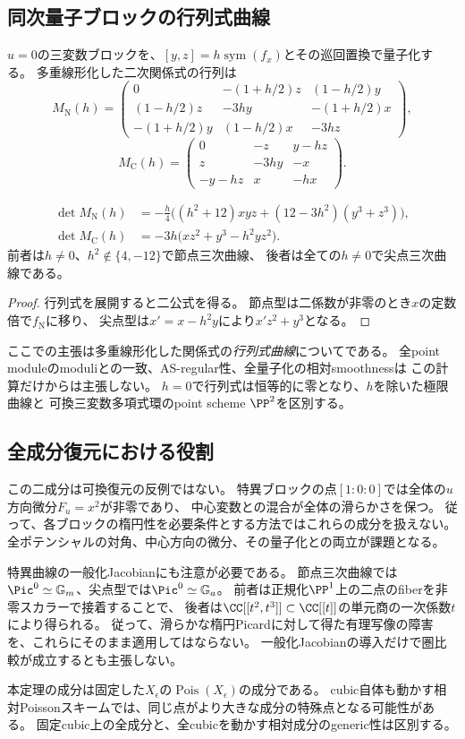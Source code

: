 \subsection{同次量子ブロックの行列式曲線}
$u=0$の三変数ブロックを、$[y,z]=h\operatorname{sym}(f_x)$とその巡回置換で量子化する。
多重線形化した二次関係式の行列は
\[
 M_{\mathrm N}(h)=\begin{pmatrix}
 0&-(1+h/2)z&(1-h/2)y\\
 (1-h/2)z&-3hy&-(1+h/2)x\\
 -(1+h/2)y&(1-h/2)x&-3hz
 \end{pmatrix},
\]
\[
 M_{\mathrm C}(h)=\begin{pmatrix}0&-z&y-hz\\z&-3hy&-x\\-y-hz&x&-hx\end{pmatrix}.
\]
\begin{proposition}\label{ne:quantum}
\begin{align*}
 \det M_{\mathrm N}(h)&=-\frac h4\bigl((h^2+12)xyz+(12-3h^2)(y^3+z^3)\bigr),\\
 \det M_{\mathrm C}(h)&=-3h\bigl(xz^2+y^3-h^2yz^2\bigr).
\end{align*}
前者は$h\ne0$、$h^2\notin\{4,-12\}$で節点三次曲線、
後者は全ての$h\ne0$で尖点三次曲線である。
\end{proposition}
\begin{proof}
行列式を展開すると二公式を得る。
節点型は二係数が非零のとき$x$の定数倍で$f_{\mathrm N}$に移り、
尖点型は$x'=x-h^2y$により$x'z^2+y^3$となる。
\end{proof}
ここでの主張は多重線形化した関係式の\emph{行列式曲線}についてである。
全point moduleのmoduliとの一致、AS-regular性、全量子化の相対smoothnessは
この計算だけからは主張しない。
$h=0$で行列式は恒等的に零となり、$h$を除いた極限曲線と
可換三変数多項式環のpoint scheme $\PP^2$を区別する。

\subsection{全成分復元における役割}
この二成分は可換復元の反例ではない。
特異ブロックの点$[1:0:0]$では全体の$u$方向微分$F_u=x^2$が非零であり、
中心変数との混合が全体の滑らかさを保つ。
従って、各ブロックの楕円性を必要条件とする方法ではこれらの成分を扱えない。
全ポテンシャルの対角、中心方向の微分、その量子化との両立が課題となる。

特異曲線の一般化Jacobianにも注意が必要である。
節点三次曲線では$\Pic^0\simeq\mathbb G_m$、尖点型では$\Pic^0\simeq\mathbb G_a$。
前者は正規化$\PP^1$上の二点のfiberを非零スカラーで接着することで、
後者は$\CC[[t^2,t^3]]\subset\CC[[t]]$の単元商の一次係数$t$により得られる。
従って、滑らかな楕円Picardに対して得た有理写像の障害を、これらにそのまま適用してはならない。
一般化Jacobianの導入だけで圏比較が成立するとも主張しない。

\begin{remark}[固定底と動く底]
本定理の成分は固定した$X_\epsilon$の$\operatorname{Pois}(X_\epsilon)$の成分である。
cubic自体も動かす相対Poissonスキームでは、同じ点がより大きな成分の特殊点となる可能性がある。
固定cubic上の全成分と、全cubicを動かす相対成分のgeneric性は区別する。
\end{remark}